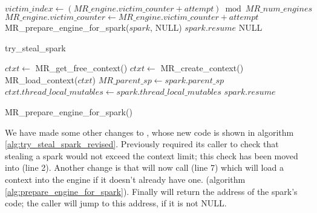 \begin{algorithm}[tbp]
\begin{algorithmic}[1]
      \State $victim\_index \gets
          (MR\_engine.victim\_counter + attempt) \bmod MR\_num\_engines$
        \State $MR\_engine.victim\_counter \gets
          MR\_engine.victim\_counter + attempt$
        \State MR\_prepare\_engine\_for\_spark($spark$, NULL)
        \State \Return $spark.resume$
      \EndIf
    \EndFor
  \EndIf
  \State \Return NULL
\EndProcedure
\end{algorithmic}
\caption{try\_steal\_spark}
\label{alg:try_steal_spark_revised}
\end{algorithm}

\begin{algorithm}[tbp]
\begin{algorithmic}
        \State $ctxt \gets$ MR\_get\_free\_context()
            \State $ctxt \gets$ MR\_create\_context()
        \EndIf
        \State MR\_load\_context($ctxt$)
    \EndIf
    \State $MR\_parent\_sp \gets spark.parent\_sp$
    \State $ctxt.thread\_local\_mutables \gets
      spark.thread\_local\_mutables$
    \State \Return $spark.resume$
\EndProcedure
\end{algorithmic}
\caption{MR\_prepare\_engine\_for\_spark()}
\label{alg:prepare_engine_for_spark}
\end{algorithm}

We have made some other changes to \trystealspark,
whose new code is shown in algorithm \ref{alg:try_steal_spark_revised}.
Previously \trystealspark required its caller to check that stealing a spark
would not exceed the context limit;
this check has been moved into \trystealspark (line 2).
Another change is that \trystealspark
will now call \prepareengineforspark (line 7)
which will load a context into the engine if it doesn't already have one.
(algorithm \ref{alg:prepare_engine_for_spark}).
Finally \trystealspark will return the address of the spark's code;
the caller will jump to this address,
if it is not NULL.

